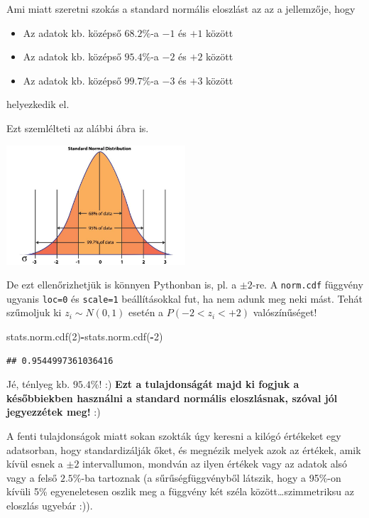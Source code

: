 \documentclass[
]{book}
\newenvironment{Shaded}{\begin{snugshade}}{\end{snugshade}}
\newcommand{\DecValTok}[1]{\textcolor[rgb]{0.00,0.00,0.81}{#1}}
\newcommand{\NormalTok}[1]{#1}
\newcommand{\OperatorTok}[1]{\textcolor[rgb]{0.81,0.36,0.00}{\textbf{#1}}}
\providecommand{\tightlist}{%
  \setlength{\itemsep}{0pt}\setlength{\parskip}{0pt}}
\begin{document}
Ami miatt szeretni szokás a standard normális eloszlást az az a jellemzője, hogy

\begin{itemize}
\tightlist
\item
  Az adatok kb. középső \(68.2\%\)-a \(-1\) és \(+1\) között
\item
  Az adatok kb. középső \(95.4\%\)-a \(-2\) és \(+2\) között
\item
  Az adatok kb. középső \(99.7\%\)-a \(-3\) és \(+3\) között
\end{itemize}

helyezkedik el.

Ezt szemlélteti az alábbi ábra is.

\includegraphics[width=0.5\textwidth,height=\textheight]{stnormal.png}

De ezt ellenőrizhetjük is könnyen Pythonban is, pl. a \(\pm2\)-re. A \texttt{norm.cdf} függvény ugyanis \texttt{loc=0} és \texttt{scale=1} beállításokkal fut, ha nem adunk meg neki mást. Tehát szűmoljuk ki \(z_i \sim N(0,1)\) esetén a \(P(-2 < z_i < +2)\) valószínűséget!

\begin{Shaded}
\begin{Highlighting}[]
\NormalTok{stats.norm.cdf(}\DecValTok{2}\NormalTok{)}\OperatorTok{{-}}\NormalTok{stats.norm.cdf(}\OperatorTok{{-}}\DecValTok{2}\NormalTok{)}
\end{Highlighting}
\end{Shaded}

\begin{verbatim}
## 0.9544997361036416
\end{verbatim}

Jé, ténlyeg kb. \(95.4\%\)! :) \textbf{Ezt a tulajdonságát majd ki fogjuk a későbbiekben használni a standard normális eloszlásnak, szóval jól jegyezzétek meg!} :)

A fenti tulajdonságok miatt sokan szokták úgy keresni a kilógó értékeket egy adatsorban, hogy standardizálják őket, és megnézik melyek azok az értékek, amik kívül esnek a \(\pm2\) intervallumon, mondván az ilyen értékek vagy az adatok alsó vagy a felső \(2.5\%\)-ba tartoznak (a sűrűségfüggvényből látszik, hogy a 95\%-on kívüli 5\% egyeneletesen oszlik meg a függvény két széla között\ldots szimmetriksu az eloszlás ugyebár :)).
\end{document}
